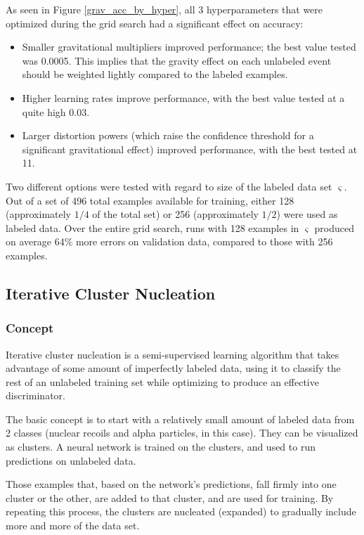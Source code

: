 \documentclass[10pt]{article}
\begin{document}
As seen in Figure \ref{grav_acc_by_hyper}, all 3 hyperparameters that were optimized during the grid search had a significant effect on accuracy:

\begin{itemize}
    \item Smaller gravitational multipliers improved performance; the best value tested was 0.0005. This implies that the gravity effect on each unlabeled event should be weighted lightly compared to the labeled examples.
    \item Higher learning rates improve performance, with the best value tested at a quite high 0.03.
    \item Larger distortion powers (which raise the confidence threshold for a significant gravitational effect) improved performance, with the best tested at 11.
\end{itemize}

Two different options were tested with regard to size of the labeled data set $\varsigma$. Out of a set of 496 total examples available for training, either 128 (approximately $1/4$ of the total set) or 256 (approximately $1/2$) were used as labeled data. Over the entire grid search, runs with 128 examples in $\varsigma$ produced on average 64\% more errors on validation data, compared to those with 256 examples.

\subsection{Iterative Cluster Nucleation}

\subsubsection{Concept}

Iterative cluster nucleation is a semi-supervised learning algorithm that takes advantage of some amount of imperfectly labeled data, using it to classify the rest of an unlabeled training set while optimizing to produce an effective discriminator.

The basic concept is to start with a relatively small amount of labeled data from 2 classes (nuclear recoils and alpha particles, in this case). They can be visualized as clusters. A neural network is trained on the clusters, and used to run predictions on unlabeled data.

Those examples that, based on the network's predictions, fall firmly into one cluster or the other, are added to that cluster, and are used for training. By repeating this process, the clusters are nucleated (expanded) to gradually include more and more of the data set.
\end{document}
